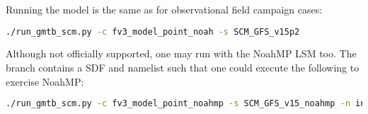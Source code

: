 Running the model is the same as for observational field campaign cases:
\begin{lstlisting}[language=bash]
./run_gmtb_scm.py -c fv3_model_point_noah -s SCM_GFS_v15p2
\end{lstlisting}

Although not officially supported, one may run with the NoahMP LSM too. The  branch contains a SDF and namelist such that one could execute the following to exercise NoahMP:
\begin{lstlisting}[language=bash]
./run_gmtb_scm.py -c fv3_model_point_noahmp -s SCM_GFS_v15_noahmp -n input_GFS_v15_noahmp.nml
\end{lstlisting}
